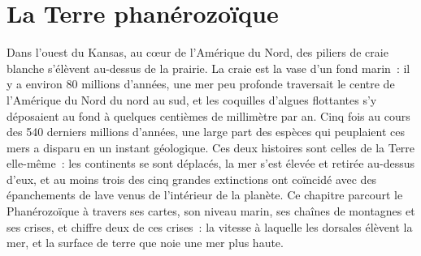 \chapter{La Terre phanérozoïque}\label{ch:b2:phanerozoic-earth}

Dans l'ouest du Kansas, au cœur de l'Amérique du Nord, des piliers de craie blanche s'élèvent au-dessus
de la prairie. La craie est la vase d'un fond marin~: il y a environ 80 millions d'années, une mer peu
profonde traversait le centre de l'Amérique du Nord du nord au sud, et les coquilles d'algues flottantes
s'y déposaient au fond à quelques centièmes de millimètre par an. Cinq fois au cours des 540 derniers
millions d'années, une large part des espèces qui peuplaient ces mers a disparu en un instant géologique.
Ces deux histoires sont celles de la Terre elle-même~: les continents se sont déplacés, la mer s'est
élevée et retirée au-dessus d'eux, et au moins trois des cinq grandes extinctions ont coïncidé avec des
épanchements de lave venus de l'intérieur de la planète. Ce chapitre parcourt le Phanérozoïque à travers
ses cartes, son niveau marin, ses chaînes de montagnes et ses crises, et chiffre deux de ces crises~:
la vitesse à laquelle les dorsales élèvent la mer, et la surface de terre que noie une mer plus haute.

